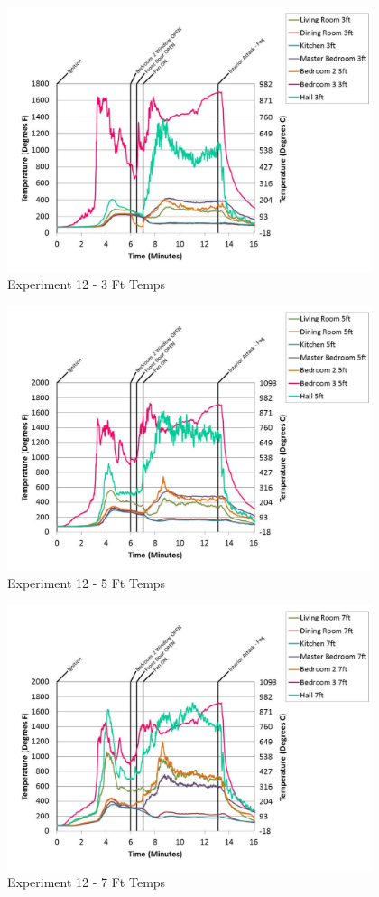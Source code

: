 \documentclass{article}
\begin{document}
\begin{appendices}
	\begin{figure}[h!]
		\centering
		\includegraphics[height=3.05in]{0_Images/Results_Charts/Exp_12_Charts/3FtTemps.pdf}
		\caption{Experiment 12 - 3 Ft Temps}
	\end{figure}
 
	\clearpage

	\begin{figure}[h!]
		\centering
		\includegraphics[height=3.05in]{0_Images/Results_Charts/Exp_12_Charts/5FtTemps.pdf}
		\caption{Experiment 12 - 5 Ft Temps}
	\end{figure}
 

	\begin{figure}[h!]
		\centering
		\includegraphics[height=3.05in]{0_Images/Results_Charts/Exp_12_Charts/7FtTemps.pdf}
		\caption{Experiment 12 - 7 Ft Temps}
	\end{figure}
 

\end{appendices}
\end{document}
